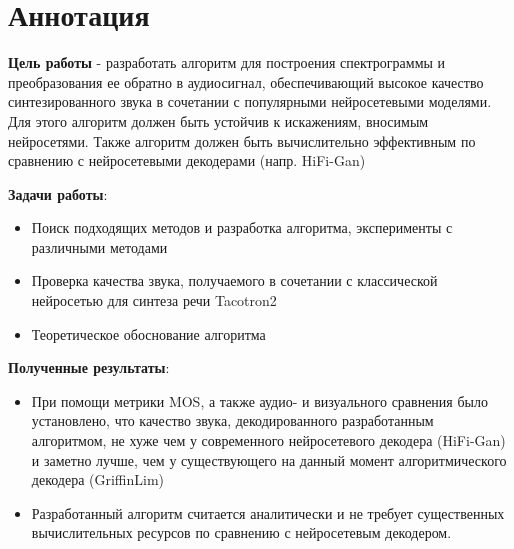 \chapter*{\centering Аннотация}


\textbf{Цель работы} - разработать алгоритм для построения спектрограммы и преобразования ее обратно в аудиосигнал, 
обеспечивающий высокое качество синтезированного звука в сочетании с популярными нейросетевыми моделями. 
Для этого алгоритм должен быть устойчив к искажениям, вносимым нейросетями. 
Также алгоритм должен быть вычислительно эффективным по сравнению с нейросетевыми декодерами (напр. HiFi-Gan)

\textbf{Задачи работы}:
\begin{itemize}
 \item Поиск подходящих методов и разработка алгоритма, эксперименты с различными методами
 \item Проверка качества звука, получаемого в сочетании с классической нейросетью для синтеза речи Tacotron2
 \item Теоретическое обоснование алгоритма
\end{itemize}

\textbf{Полученные результаты}:
\begin{itemize}
 \item При помощи метрики MOS, а также аудио- и визуального сравнения было установлено, что качество звука, декодированного разработанным алгоритмом, не хуже чем у современного нейросетевого декодера (HiFi-Gan) и заметно лучше, чем у существующего на данный момент алгоритмического декодера (GriffinLim)
 \item Разработанный алгоритм считается аналитически и не требует существенных вычислительных ресурсов по сравнению с нейросетевым декодером.
\end{itemize}

